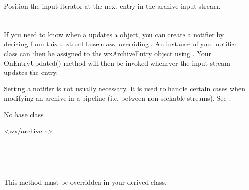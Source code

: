 
Position the input iterator at the next entry in the archive input stream.


%
%

\section{}\label{wxarchivenotifier}

If you need to know when a
  updates a
  object, you can create
a notifier by deriving from this abstract base class, overriding
 .  An instance
of your notifier class can then be assigned to the wxArchiveEntry object
using .
Your OnEntryUpdated() method will then be invoked whenever the input
stream updates the entry.

Setting a notifier is not usually necessary. It is used to handle
certain cases when modifying an archive in a pipeline (i.e. between
non-seekable streams).
See .


No base class


<wx/archive.h>




\\
\\
\\



\label{wxarchivenotifieronentryupdated}


This method must be overridden in your derived class.


